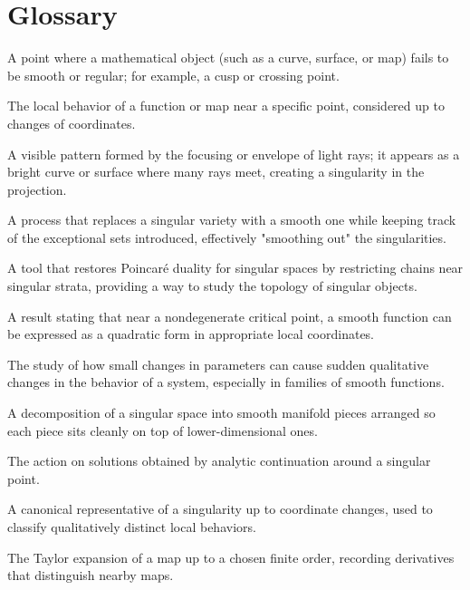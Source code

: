 \section*{Glossary}
\begin{description}[leftmargin=*,style=nextline,itemsep=0.3em]
\item[\textbf{Singularity.}] A point where a mathematical object (such as a curve, surface, or map) fails to be smooth or regular; for example, a cusp or crossing point.
\item[\textbf{Germ.}] The local behavior of a function or map near a specific point, considered up to changes of coordinates.
\item[\textbf{Caustic.}] A visible pattern formed by the focusing or envelope of light rays; it appears as a bright curve or surface where many rays meet, creating a singularity in the projection.
\item[\textbf{Resolution of singularities.}] A process that replaces a singular variety with a smooth one while keeping track of the exceptional sets introduced, effectively "smoothing out" the singularities.
\item[\textbf{Intersection cohomology.}] A tool that restores Poincaré duality for singular spaces by restricting chains near singular strata, providing a way to study the topology of singular objects.
\item[\textbf{Morse lemma.}] A result stating that near a nondegenerate critical point, a smooth function can be expressed as a quadratic form in appropriate local coordinates.
\item[\textbf{Catastrophe theory.}] The study of how small changes in parameters can cause sudden qualitative changes in the behavior of a system, especially in families of smooth functions.
\item[\textbf{Stratification.}] A decomposition of a singular space into smooth manifold pieces arranged so each piece sits cleanly on top of lower-dimensional ones.
\item[\textbf{Monodromy.}] The action on solutions obtained by analytic continuation around a singular point.
\item[\textbf{Normal form.}] A canonical representative of a singularity up to coordinate changes, used to classify qualitatively distinct local behaviors.
\item[\textbf{Jets.}] The Taylor expansion of a map up to a chosen finite order, recording derivatives that distinguish nearby maps.
\end{description}

